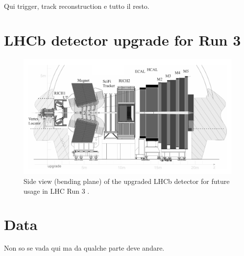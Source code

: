 Qui trigger, track reconstruction e tutto il resto.

\section{LHCb detector upgrade for Run 3}

\begin{figure}[t]
	\centering
	\includegraphics[width=\textwidth]{graphics/02-lhcb/lhcb_diagram_run3.png}
	\caption[LHCb detector side view.]{Side view (bending plane) of the upgraded LHCb detector for future usage in LHC Run 3 \cite{Piucci_2017}.}
	\label{fig:2:lhcb_diagram_run3}
\end{figure}

\section{Data}
Non so se vada qui ma da qualche parte deve andare.